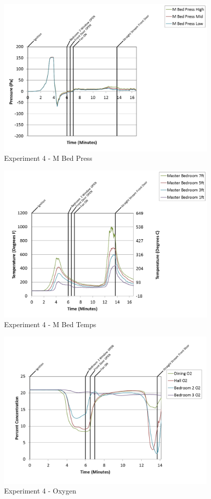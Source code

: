 \documentclass{article}
\begin{document}
\begin{appendices}
\begin{figure}[h!]
	\centering
	\includegraphics[height=3.05in]{0_Images/Results_Charts/Exp_4_Charts/MBedPress.png}
	\caption{Experiment 4 - M Bed Press}
\end{figure}

\clearpage

\begin{figure}[h!]
	\centering
	\includegraphics[height=3.05in]{0_Images/Results_Charts/Exp_4_Charts/MBedTemps.png}
	\caption{Experiment 4 - M Bed Temps}
\end{figure}


\begin{figure}[h!]
	\centering
	\includegraphics[height=3.05in]{0_Images/Results_Charts/Exp_4_Charts/Oxygen.png}
	\caption{Experiment 4 - Oxygen}
\end{figure}


\end{appendices}
\end{document}
